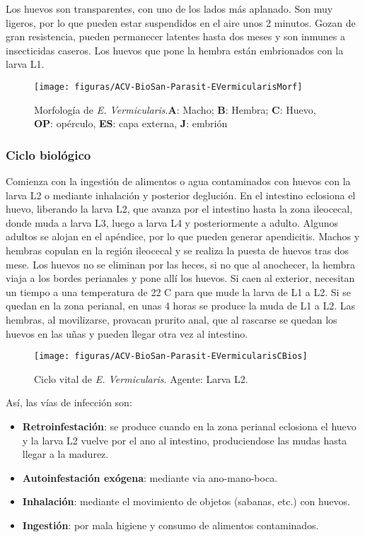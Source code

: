 Los huevos son transparentes, con uno de los lados más aplanado. Son muy ligeros, por lo que pueden estar suspendidos en el aire unos 2 minutos. Gozan de gran resistencia, pueden permanecer latentes hasta dos meses y son inmunes a insecticidas caseros. Los huevos que pone la hembra están embrionados con la larva L1.
\begin{figure}[H]
	\centering
	\texttt{[image: figuras/ACV-BioSan-Parasit-EVermicularisMorf]}
	\caption[Morfología de \textit{E. Vermicularis}]{Morfología de \textit{E. Vermicularis}.\textbf{A}: Macho; \textbf{B}: Hembra; \textbf{C}: Huevo, \textbf{OP}: opérculo, \textbf{ES}: capa externa, \textbf{J}: embrión \label{fig:PARASIT:EVermicularisMorf}}
\end{figure}
\vspace*{-1cm}
\subsubsection{Ciclo biológico}
\begin{multicols}{2}
	Comienza con la ingestión de alimentos o agua contaminados con huevos con la larva L2 o mediante inhalación y posterior deglución. En el intestino eclosiona el huevo, liberando la larva L2, que avanza por el intestino hasta la zona ileocecal, donde muda a larva L3, luego a larva L4 y posteriormente a adulto. Algunos adultos se alojan en el apéndice, por lo que pueden generar apendicitis. Machos y hembras copulan en la región ileocecal y se realiza la puesta de huevos tras dos mese. Los huevos no se eliminan por las heces, si no que al anochecer, la hembra viaja a los bordes perianales y pone allí los huevos. Si caen al exterior, necesitan un tiempo a una temperatura de 22 C para que mude la larva de L1 a L2. Si se quedan en la zona perianal, en unas 4 horas se produce la muda de L1 a L2. Las hembras, al movilizarse, provacan prurito anal, que al rascarse se quedan los huevos en las uñas y pueden llegar otra vez al intestino.
	\columnbreak
	\begin{figure}[H]
		\centering
		\texttt{[image: figuras/ACV-BioSan-Parasit-EVermicularisCBios]}
		\caption[Ciclo vital de \textit{E. Vermicularis}]{Ciclo vital de \textit{E. Vermicularis}. Agente: Larva L2.\label{fig:PARASIT:EVermicularisCBios}}
	\end{figure}
\end{multicols}
Así, las vías de infección son:
\begin{itemize}[itemsep=0pt,parsep=0pt,topsep=0pt,partopsep=0pt]
	\item\textbf{Retroinfestación}: se produce cuando en la zona perianal eclosiona el huevo y la larva L2 vuelve por el ano al intestino, produciendose las mudas hasta llegar a la madurez.
	\item\textbf{Autoinfestación exógena}: mediante via ano-mano-boca.
	\item\textbf{Inhalación}: mediante el movimiento de objetos (sabanas, etc.) con huevos.
	\item\textbf{Ingestión}: por mala higiene y consumo de alimentos contaminados.
\end{itemize}
